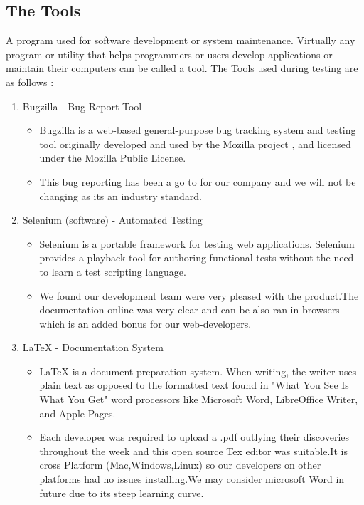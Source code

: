 \subsection{The Tools}


A program used for software development or system maintenance. Virtually any program
or utility that helps programmers
or users develop applications or maintain their computers can be called a tool.
The Tools used during testing are as follows :

\begin{enumerate}
   \item Bugzilla - Bug Report Tool
   \begin{itemize}
     \item Bugzilla is a web-based general-purpose bug tracking system and testing tool originally developed and used by the Mozilla project
     , and licensed under the Mozilla Public License.

      \item This bug reporting has been a go to for our company and we will not be changing as its an industry standard.
   \end{itemize}
   \item Selenium (software) - Automated Testing
   \begin{itemize}
     \item Selenium is a portable framework for testing web applications. Selenium provides a playback tool for authoring
      functional tests without the need to learn a test scripting language.

         \item We found our development team were very pleased with the product.The documentation online was very clear and can be also ran in browsers which is an added bonus for our  web-developers.
   \end{itemize}

   \item  LaTeX - Documentation System
   \begin{itemize}
     \item LaTeX is a document preparation system. When writing, the writer uses plain text as opposed to the formatted text found in "What You See Is What You Get"
      word processors like Microsoft Word, LibreOffice Writer, and Apple Pages.


       \item Each developer was required to upload a .pdf outlying their discoveries throughout the week and this open source Tex editor was suitable.It is cross Platform (Mac,Windows,Linux) so our developers on other platforms had no issues installing.We may consider microsoft Word in future due to its steep learning curve.
   \end{itemize}



\end{enumerate}
